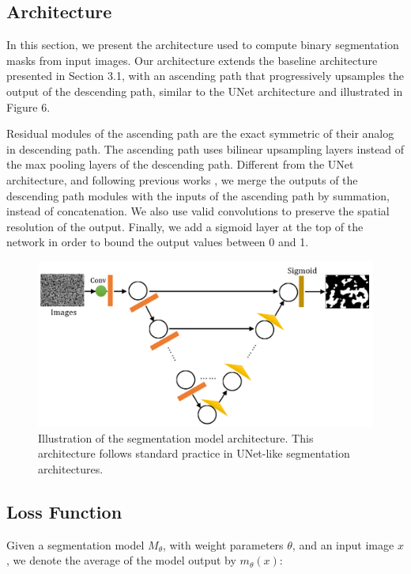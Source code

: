 \documentclass[10pt,twocolumn,letterpaper]{article}
\begin{document}
\subsection{Architecture}

% 
In this section, we present the architecture used 
to compute binary segmentation masks from input images.
Our architecture extends the baseline architecture presented in Section 3.1,
with an ascending path that progressively upsamples the output
of the descending path, similar to the UNet architecture \cite{ronneberger2015u} and illustrated in Figure 6.

Residual modules of the ascending path are the exact symmetric of their analog in descending path.
The ascending path uses bilinear upsampling layers 
instead of the max pooling layers of the descending path.
Different from the UNet architecture, and following previous works \cite{lee2017superhuman,smith2016deep},
we merge the outputs of the descending path modules with the inputs of the ascending path 
by summation, instead of concatenation. 
We also use valid convolutions to preserve the spatial resolution of the output.
Finally, we add a sigmoid layer at the top of the network in order to bound the output values between 0 and 1.

\begin{figure}[h]
\centering
\includegraphics[width=0.9\linewidth]{"./figures/Figure6"}
\caption{
Illustration of the segmentation model architecture.
This architecture follows standard practice in 
UNet-like segmentation architectures.
}
\end{figure}

\subsection{Loss Function}

Given a segmentation model $M_{\theta}$, 
with weight parameters $\theta$, 
and an input image $x$,
we denote the average of the model output by $m_{\theta}(x)$:
\end{document}
